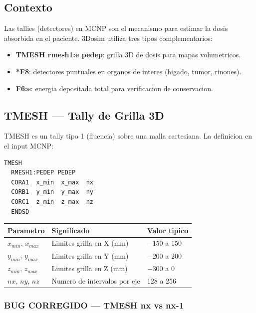 \documentclass[12pt,a4paper]{article}
\begin{document}
\subsection{Contexto}

Las tallies (detectores) en MCNP son el mecanismo para estimar la dosis absorbida en el paciente. 3Dosim utiliza tres tipos complementarios:

\begin{itemize}
    \item \textbf{TMESH rmesh1:e pedep}: grilla 3D de dosis para mapas volumetricos.
    \item \textbf{*F8}: detectores puntuales en organos de interes (higado, tumor, rinones).
    \item \textbf{F6:e}: energia depositada total para verificacion de conservacion.
\end{itemize}

\subsection{TMESH --- Tally de Grilla 3D}

TMESH es un tally tipo 1 (fluencia) sobre una malla cartesiana. La definicion en el input MCNP:

\begin{verbatim}
TMESH
  RMESH1:PEDEP PEDEP
  CORA1  x_min  x_max  nx
  CORB1  y_min  y_max  ny
  CORC1  z_min  z_max  nz
  ENDSD
\end{verbatim}

\begin{center}
\begin{tabular}{lll}
\toprule
\textbf{Parametro} & \textbf{Significado} & \textbf{Valor tipico} \\
\midrule
$x_{min}$, $x_{max}$ & Limites grilla en X (mm) & $-150$ a $150$ \\
$y_{min}$, $y_{max}$ & Limites grilla en Y (mm) & $-200$ a $200$ \\
$z_{min}$, $z_{max}$ & Limites grilla en Z (mm) & $-300$ a $0$ \\
$nx$, $ny$, $nz$ & Numero de intervalos por eje & 128 a 256 \\
\bottomrule
\end{tabular}
\end{center}

\subsubsection{BUG CORREGIDO --- TMESH nx vs nx-1}
\end{document}

